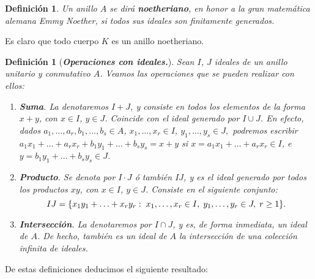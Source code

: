 \documentclass[12pt]{article}
\newtheorem{definition}[theorem]{Definición}
\begin{document}
\begin{definition}
Un anillo $A$ se dirá \textbf{noetheriano}, en honor a la gran matemática alemana Emmy Noether, si todos sus ideales son finitamente generados.
\end{definition}

Es claro que todo cuerpo $K$ es un anillo noetheriano.

\begin{definition}[\textbf{\textit{Operaciones con ideales.}}] Sean $I$, $J$ ideales de un anillo unitario y conmutativo $A$. Veamos las operaciones que se pueden realizar con ellos:\begin{enumerate}
\item \textbf{Suma}. La denotaremos $I + J$, y consiste en todos los elementos de la forma $x+ y$, con $x \in I$, $y \in J$. Coincide con el ideal generado por $I \cup J$. En efecto, dados $a_{1}, \ldots, a_{r}, b_{1}, \ldots, b_{s} \in A$, $x_{1}, \ldots, x_{r} \in I$, $y_{1}, \ldots, y_{s} \in J,$ podremos escribir $a_{1}x_{1} + \ldots + a_{r}x_{r} + b_{1}y_{1} + \ldots + b_{s}y_{s} = x + y$ si $x = a_{1}x_{1} + \ldots + a_{r}x_{r} \in I$, e $y= b_{1}y_{1} + \ldots + b_{s}y_{s} \in J$.
\item \textbf{Producto}. Se denota por $I \cdot J$ ó también $IJ$, y es el ideal generado por todos los productos $xy$, con $x \in I$, $y \in J$. Consiste en el siguiente conjunto: $$IJ = \lbrace x_{1}y_{1} + \ldots + x_{r}y_{r} : \hspace{0.1cm} x_{1}, \ldots, x_{r} \in I, \hspace{0.1cm} y_{1}, \ldots, y_{r} \in J, \hspace{0.1cm} r \geq 1 \rbrace.$$
\item \textbf{Intersección}. La denotaremos por $I \cap J$, y es, de forma inmediata, un ideal de $A$. De hecho, también es un ideal de $A$ la intersección de una colección infinita de ideales.
\end{enumerate}
\end{definition}

De estas definiciones deducimos el siguiente resultado:
\end{document}
